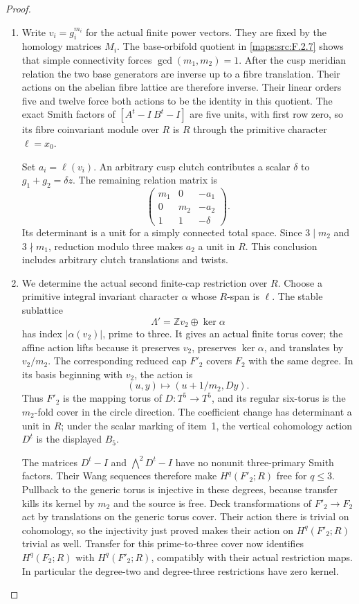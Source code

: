 \documentclass[11pt,a4paper]{article}
\theoremstyle{definition}
\begin{document}
\begin{proof}
\begin{enumerate}[label=\arabic*.]
\item Write $v_i=g_i^{m_i}$ for the actual finite power vectors.
They are fixed by the homology matrices $M_i$.
The base-orbifold quotient in \cref{maps:src:F.2.7} shows that
simple connectivity forces $\gcd(m_1,m_2)=1$.
After the cusp meridian relation the two base generators are
inverse up to a fibre translation.  Their actions on the abelian
fibre lattice are therefore inverse.  Their linear orders five
and twelve force both actions to be the identity in this quotient.
The exact Smith factors of $[A^t-I\ B^t-I]$ are five units,
with first row zero, so its fibre coinvariant module over $R$
is $R$ through the primitive character $\ell=x_0$.

Set $a_i=\ell(v_i)$.  An arbitrary cusp clutch contributes a scalar
$\delta$ to $g_1+g_2=\delta z$.  The remaining relation matrix is
\[
 \begin{pmatrix}m_1&0&-a_1\\0&m_2&-a_2\\1&1&-\delta\end{pmatrix}.
\]
Its determinant is a unit for a simply connected total space.
Since $3\mid m_2$ and $3\nmid m_1$, reduction modulo three makes
$a_2$ a unit in $R$.  This conclusion includes arbitrary clutch
translations and twists.

\item We determine the actual second finite-cap restriction over $R$.
Choose a primitive integral invariant character $\alpha$ whose
$R$-span is $\ell$.  The stable sublattice
\[
 \Lambda'=\mathbb Z v_2\oplus\ker\alpha
\]
has index $|\alpha(v_2)|$, prime to three.  It gives an actual
finite torus cover; the affine action lifts because it preserves
$v_2$, preserves $\ker\alpha$, and translates by $v_2/m_2$.
The corresponding reduced cap $F'_2$ covers $F_2$ with the same
degree.  In its basis beginning with $v_2$, the action is
\[
 (u,y)\longmapsto(u+1/m_2,Dy).
\]
Thus $F'_2$ is the mapping torus of $D:T^5\to T^5$, and its
regular six-torus is the $m_2$-fold cover in the circle direction.
The coefficient change has determinant a unit in $R$; under the
scalar marking of item~1, the vertical cohomology action $D^t$
is the displayed $B_5$.

The matrices $D^t-I$ and $\bigwedge^2D^t-I$ have no nonunit
three-primary Smith factors.  Their Wang sequences therefore make
$H^q(F'_2;R)$ free for $q\leq3$.  Pullback to the generic torus
is injective in these degrees, because transfer kills its kernel
by $m_2$ and the source is free.  Deck transformations of
$F'_2\to F_2$ act by translations on the generic torus cover.
Their action there is trivial on cohomology, so the injectivity
just proved makes their action on $H^q(F'_2;R)$ trivial as well.
Transfer for this prime-to-three cover now identifies
$H^q(F_2;R)$ with $H^q(F'_2;R)$, compatibly with their actual
restriction maps.  In particular the degree-two and degree-three
restrictions have zero kernel.


\end{enumerate}
\end{proof}
\end{document}
